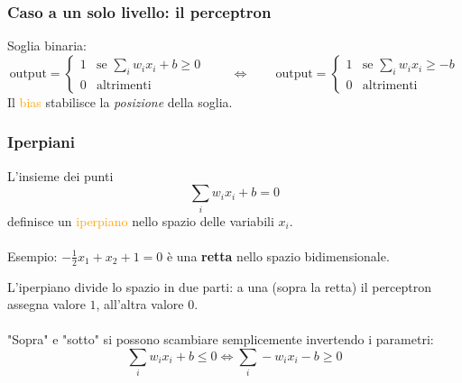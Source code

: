\documentclass[a4paper,12pt]{article}
\newcommand{\hl}[1]{\textcolor{orange}{#1}}
\begin{document}
\subsubsection{Caso a un solo livello: il perceptron}
Soglia binaria:
\[ \text{output} = \begin{cases} 1 & \text{se } \sum_i w_i x_i + b \ge 0 \\ 0 & \text{altrimenti} \end{cases}
\qquad\Longleftrightarrow\qquad
\text{output} = \begin{cases} 1 & \text{se } \sum_i w_i x_i \ge -b \\ 0 & \text{altrimenti} \end{cases} \]
Il \hl{bias} stabilisce la \textit{posizione} della soglia.

\subsubsection{Iperpiani}
L'insieme dei punti
\[ \sum_i w_i x_i + b = 0 \]
definisce un \hl{iperpiano} nello spazio delle variabili $x_i$.\\
\vspace{1px}\\
Esempio: $-\frac{1}{2}x_1 + x_2 + 1 = 0$ è una \textbf{retta} nello spazio bidimensionale.
\begin{center}
\end{center}
L'iperpiano divide lo spazio in due parti: a una (sopra la retta) il perceptron assegna valore $1$, all'altra valore $0$.\\
\vspace{1px}\\
"Sopra" e "sotto" si possono scambiare semplicemente invertendo i parametri:
\[ \sum_i w_i x_i + b \le 0 \iff \sum_i -w_i x_i - b \ge 0 \]
\end{document}
